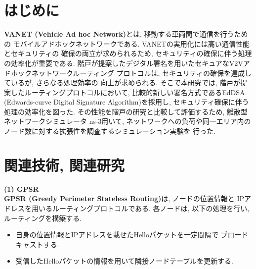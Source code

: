 \documentclass[a4j,9pt,twocolumn]{jsarticle}
\begin{document}
\pagestyle{empty} %

\section{はじめに}
\textbf{VANET (Vehicle Ad hoc Network)}とは, 移動する車両間で通信を行うための
モバイルアドホックネットワークである. VANETの実用化には高い通信性能とセキュリティの
確保の両立が求められるため, セキュリティの確保に伴う処理の効率化が重要である. 
階戸が提案したデジタル署名を用いたセキュアなV2Vアドホックネットワークルーティング
プロトコル\cite{shinato}は, セキュリティの確保を達成しているが, さらなる処理効率の
向上が求められる. そこで本研究では, 階戸が提案したルーティングプロトコルにおいて, 
比較的新しい署名方式であるEdDSA (Edwards-curve Digital Signature Algorithm)を採用し, 
セキュリティ確保に伴う処理の効率化を図った.  
その性能を階戸の研究と比較して評価するため, 離散型ネットワークシミュレータ ns-3用いて, 
ネットワークへの負荷や同一エリア内のノード数に対する拡張性を調査するシミュレーション実験を
行った. 
\section{関連技術, 関連研究}
\noindent \textbf{(1) GPSR}\\
\indent \textbf{GPSR (Greedy Perimeter Stateless Routing)}\cite{gpsr}は, ノードの位置情報と
IPアドレスを用いるルーティングプロトコルである. 各ノードは, 以下の処理を行い, 
ルーティングを構築する. 
\begin{itemize}
\item 自身の位置情報とIPアドレスを載せたHelloパケットを一定間隔で
ブロードキャストする.
\item 受信したHelloパケットの情報を用いて隣接ノードテーブルを更新する.
\end{itemize}
\end{document}

